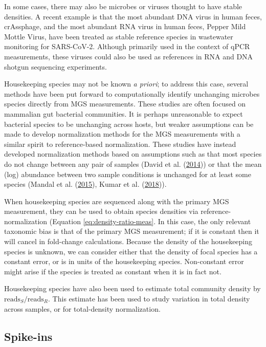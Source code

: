 \documentclass[
]{article}
\begin{document}
In some cases, there may also be microbes or viruses thought to have stable densities.
A recent example is that the most abundant DNA virus in human feces, crAssphage, and the most abundant RNA virus in human feces, Pepper Mild Mottle Virus, have been treated as stable reference species in wastewater monitoring for SARS-CoV-2.
Although primarily used in the context of qPCR measurements, these viruses could also be used as references in RNA and DNA shotgun sequencing experiments.

Housekeeping species may not be known \emph{a priori}; to address this case, several methods have been put forward to computationally identify unchanging microbes species directly from MGS measurements.
These studies are often focused on mammalian gut bacterial communities.
It is perhaps unreasonable to expect bacterial species to be unchanging across hosts, but weaker assumptions can be made to develop normalization methods for the MGS measurements with a similar spirit to reference-based normalization.
These studies have instead developed normalization methods based on assumptions such as that most species do not change between any pair of samples (David et al. (\protect\hyperlink{ref-david2014host}{2014})) or that the mean (log) abundance between two sample conditions is unchanged for at least some species (Mandal et al. (\protect\hyperlink{ref-mandal2015anal}{2015}), Kumar et al. (\protect\hyperlink{ref-kumar2018anal}{2018})).

When housekeeping species are sequenced along with the primary MGS measurement, they can be used to obtain species densities via reference-normalization (Equation \eqref{eq:density-ratio-meas}.
In this case, the only relevant taxonomic bias is that of the primary MGS measurement; if it is constant then it will cancel in fold-change calculations.
Because the density of the housekeeping species is unknown, we can consider either that the density of focal species has a constant error, or is in units of the housekeeping species.
Non-constant error might arise if the species is treated as constant when it is in fact not.

Housekeeping species have also been used to estimate total community density by \(\text{reads}_{S} / \text{reads}_{R}\).
This estimate has been used to study variation in total density across samples, or for total-density normalization.

\hypertarget{spike-ins}{%
\subsection{Spike-ins}\label{spike-ins}}
\end{document}
